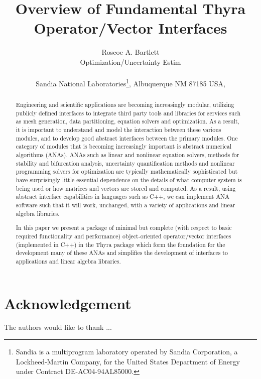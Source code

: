 \documentclass[pdf,ps2pdf,11pt]{SANDreport}
\title{ Overview of Fundamental Thyra Operator/Vector Interfaces }
\author{
Roscoe A. Bartlett \\ Optimization/Uncertainty Estim \\ \\
Sandia National Laboratories\footnote{
Sandia is a multiprogram laboratory operated by Sandia Corporation, a
Lockheed-Martin Company, for the United States Department of Energy
under Contract DE-AC04-94AL85000.}, Albuquerque NM 87185 USA, \\
}
\date{}
\begin{document}
\maketitle

%

%
\begin{abstract}
%
Engineering and scientific applications are becoming increasingly modular,
utilizing publicly defined interfaces to integrate third party tools and
libraries for services such as mesh generation, data partitioning, equation
solvers and optimization.  As a result, it is important to understand and
model the interaction between these various modules, and to develop good
abstract interfaces between the primary modules.  One category of modules that
is becoming increasingly important is abstract numerical algorithms (ANAs).
ANAs such as linear and nonlinear equation solvers, methods for stability and
bifurcation analysis, uncertainty quantification methods and nonlinear
programming solvers for optimization are typically mathematically
sophisticated but have surprisingly little essential dependence on the details
of what computer system is being used or how matrices and vectors are stored
and computed.  As a result, using abstract interface capabilities in languages
such as C++, we can implement ANA software such that it will work, unchanged,
with a variety of applications and linear algebra libraries.

In this paper we present a package of minimal but complete (with respect to
basic required functionality and performance) object-oriented operator/vector
interfaces (implemented in C++) in the Thyra package which form the foundation
for the development many of these ANAs and simplifies the development of
interfaces to applications and linear algebra libraries.
%
\end{abstract}
%

%
\clearpage
\section*{Acknowledgement}
The authors would like to thank ...
\end{document}
